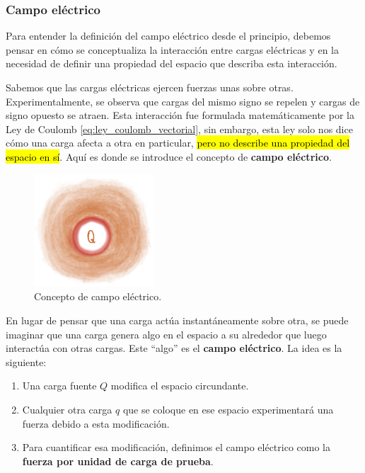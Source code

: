 \subsubsection{Campo eléctrico}

Para entender la definición del campo eléctrico desde el principio, debemos pensar en cómo se conceptualiza la interacción entre cargas eléctricas y en la necesidad de definir una propiedad del espacio que describa esta interacción.

Sabemos que las cargas eléctricas ejercen fuerzas unas sobre otras. Experimentalmente, se observa que cargas del mismo signo se repelen y cargas de signo opuesto se atraen. Esta interacción fue formulada matemáticamente por la Ley de Coulomb \eqref{eq:ley_coulomb_vectorial}, sin embargo, esta ley solo nos dice cómo una carga afecta a otra en particular, \hl{pero no describe una propiedad del espacio en sí}. Aquí es donde se introduce el concepto de \textbf{campo eléctrico}.

\begin{figure}[ht]
    \centering
    \includegraphics[width=0.4\textwidth]{images/field_concept.png}
    \caption{Concepto de campo eléctrico.}
    \label{fig:concepto_campo_electrico}
\end{figure}

En lugar de pensar que una carga actúa instantáneamente sobre otra, se puede imaginar que una carga genera algo en el espacio a su alrededor que luego interactúa con otras cargas. Este ``algo'' es el \textbf{campo eléctrico}. La idea es la siguiente:

\begin{enumerate}
    \item Una carga fuente \( Q \) modifica el espacio circundante.
    \item Cualquier otra carga \( q \) que se coloque en ese espacio experimentará una fuerza debido a esta modificación.
    \item Para cuantificar esa modificación, definimos el campo eléctrico como la \textbf{fuerza por unidad de carga de prueba}.
\end{enumerate}

